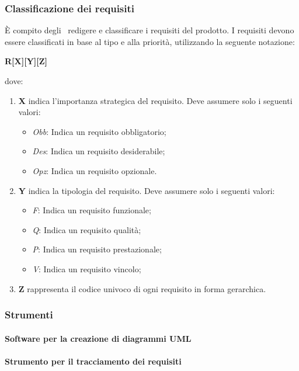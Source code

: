 \documentclass[../NormeProgetto.tex]{subfiles}
\begin{document}
		\subsubsection{Classificazione dei requisiti}
		È compito degli \analisti\ redigere e classificare i requisiti del prodotto.  I requisiti devono essere classificati in base al tipo e alla priorità, utilizzando la seguente notazione:
		\begin{center}\textbf{R[X][Y][Z]}\end{center} dove:
			\begin{enumerate}
				\item \textbf{X} indica l'importanza strategica del requisito. Deve assumere solo i seguenti valori:
					\begin{itemize}
						\item \textit{Obb}: Indica un requisito obbligatorio;
						\item \textit{Des}: Indica un requisito desiderabile;
						\item \textit{Opz}: Indica un requisito opzionale.
					\end{itemize}
				\item \textbf{Y} indica la tipologia del requisito. Deve assumere solo i seguenti valori:
					\begin{itemize}
						\item \textit{F}: Indica un requisito funzionale;
						\item \textit{Q}: Indica un requisito qualità;
						\item \textit{P}: Indica un requisito prestazionale;
						\item \textit{V}: Indica un requisito vincolo;
					\end{itemize}
				\item \textbf{Z} rappresenta il codice univoco di ogni requisito in forma gerarchica.
			\end{enumerate}
		\subsubsection{Strumenti}
			\paragraph{Software per la creazione di diagrammi UML}
			\paragraph{Strumento per il tracciamento dei requisiti}
\end{document}
